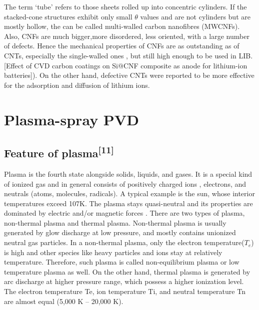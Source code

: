 The term  ‘tube’  refers to those sheets rolled up into concentric cylinders. If the stacked-cone structures exhibit only small $\theta$  values and are not cylinders but are mostly hollow, the can be called multi-walled carbon nanofibres (MWCNFs). Also, CNFs are much bigger,more disordered, less oriented, with a large number of  defects.  Hence the mechanical properties of CNFs are as  outstanding as of CNTs, especially the single-walled ones , but still high enough to be used in LIB. [Effect of CVD carbon coatings on Si@CNF composite as anode for lithium-ion batteries]). On the other hand, defective CNTs were reported to be more effective for the adsorption and diffusion of lithium ions. 

\section{Plasma-spray PVD}
\subsection{Feature of plasma\textsuperscript{[11]}}
Plasma is the fourth state alongside solids, liquids, and gases. It is a special kind of ionized gas and in general consists of positively charged ions , electrons, and neutrals (atoms, molecules, radicals). A typical example is the sun, whose interior temperatures exceed 107K. The plasma stays quasi-neutral and its properties are dominated by electric and/or magnetic forces .
There are two types of plasma, non-thermal plasma and thermal plasma. Non-thermal plasma is usually generated by glow discharge at low pressure, and mostly contains unionized neutral gas particles. In a non-thermal plasma, only the electron temperature($T_{e}$) is high and other species like heavy particles and ions stay at relatively temperature. Therefore, such plasma is called non-equilibrium plasma or low temperature plasma as well. On the other hand, thermal plasma is generated by arc discharge at higher pressure range, which possess a higher ionization level. The electron temperature Te, ion temperature Ti, and neutral temperature Tn are almost equal (5,000 K -- 20,000 K).

